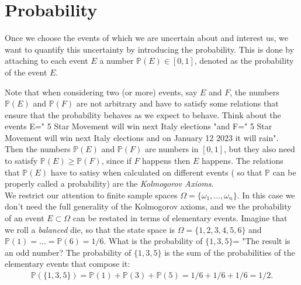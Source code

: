 \documentclass[12pt]{article}
\newcommand{\<}{{\langle \!\! \langle}}
\renewcommand{\>}{{\rangle \!\! \rangle}}
\newcommand{\bel}[2]{\begin{equation} \label{#1} \begin{split} #2
 					\end{split} \end{equation}}
\begin{document}
%
%
%
%
%
%
%
%
%

\section{Probability}

Once we choose the events of which we are uncertain about and interest us, we want to quantify this uncertainty by introducing the probability. This is done by attaching to each event $E$ a number $\mathbb{P}(E)\in[0,1]$, denoted as the probability of the event $E$. 
 
Note that when considering two (or more) events, say $E$ and $F$, the numbers $\mathbb{P}(E)$ and $\mathbb{P}(F)$ are not arbitrary and have to satisfy some relations that ensure that the probability behaves as we expect to behave. Think about the events E=" 5 Star Movement will win next Italy elections "and F=" 5 Star Movement will win next Italy elections and on January 12 2023 it will rain". Then the numbers $\mathbb{P}(E)$ and $\mathbb{P}(F)$ are numbers in  $[0,1]$, but they also need to satisfy $\mathbb{P}(E) \geq \mathbb{P}(F)$, since if $F$ happens then $E$ happens. The relations that $\mathbb{P}(E)$ have to satisy when calculated on different events ( so that  $\mathbb{P}$ can be properly called a probability) are the \emph{Kolmogorov Axioms}.\\
 We restrict our attention to finite sample spaces $\Omega=\{\omega_1,...,\omega_n\}$. In this case we don't need the full generality of the Kolmogorov axioms,  and we the probability of an event $E\subset \Omega$ can be restated in terms of elementary events. 
 Imagine that we roll a \emph{balanced} die, so that the state space is $\Omega=\{1,2,3,4,5,6\}$ and $\mathbb{P}(1)=...=\mathbb{P}(6)=1/6$. What is the probability of $\{1,3,5\}$= "The result is an odd number? The probability of $\{1,3,5\}$ is the sum of the probabilities of the elementary events that compose it: 
\bel{}{\mathbb{P}(\{1,3,5\})=\mathbb{P}(1)+\mathbb{P}(3)+\mathbb{P}(5)=1/6+1/6+1/6=1/2.} 
\end{document}

